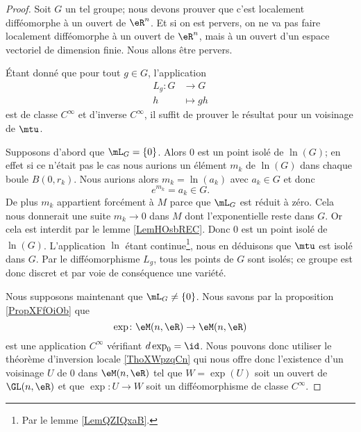 \begin{proof}
    Soit \( G\) un tel groupe; nous devons prouver que c'est localement difféomorphe à un ouvert de \( \eR^n\). Et si on est pervers, on ne va pas faire localement difféomorphe à un ouvert de \( \eR^n\), mais à un ouvert d'un espace vectoriel de dimension finie. Nous allons être pervers.

    Étant donné que pour tout \( g\in G\), l'application 
    \begin{equation}
        \begin{aligned}
            L_g\colon G&\to G \\
            h&\mapsto gh 
        \end{aligned}
    \end{equation}
    est de classe \(  C^{\infty}\) et d'inverse \(  C^{\infty}\), il suffit de prouver le résultat pour un voisinage de \( \mtu\).

    Supposons d'abord que \( \mL_G=\{ 0 \}\). Alors \( 0\) est un point isolé de \( \ln(G)\); en effet si ce n'était pas le cas nous aurions un élément \( m_k\) de \( \ln(G)\) dans chaque boule \( B(0,r_k)\). Nous aurions alors \( m_k=\ln(a_k)\) avec \( a_k\in G\) et donc
    \begin{equation}
        e^{m_k}=a_k\in G.
    \end{equation}
    De plus \( m_k\) appartient forcément à \( M\) parce que \( \mL_G\) est réduit à zéro. Cela nous donnerait une suite \( m_k\to 0\) dans \( M\) dont l'exponentielle reste dans \( G\). Or cela est interdit par le lemme \ref{LemHOsbREC}. Donc \( 0\) est un point isolé de \( \ln(G)\). L'application \(\ln\) étant continue\footnote{Par le lemme \ref{LemQZIQxaB}.}, nous en déduisons que \( \mtu\) est isolé dans \( G\). Par le difféomorphisme \( L_g\), tous les points de \( G\) sont isolés; ce groupe est donc discret et par voie de conséquence une variété.

    Nous supposons maintenant que \( \mL_G\neq\{ 0 \}\). Nous savons par la proposition \ref{PropXFfOiOb} que 
    \begin{equation}
        \exp\colon \eM(n,\eR)\to \eM(n,\eR)
    \end{equation}
    est une application \(  C^{\infty}\) vérifiant \( d\exp_0=\id\). Nous pouvons donc utiliser le théorème d'inversion locale \ref{ThoXWpzqCn} qui nous offre donc l'existence d'un voisinage \( U\) de \( 0\) dans \( \eM(n,\eR)\) tel que \( W=\exp(U)\) soit un ouvert de \( \GL(n,\eR)\) et que \( \exp\colon U\to W\) soit un difféomorphisme de classe \(  C^{\infty}\).


\end{proof}
